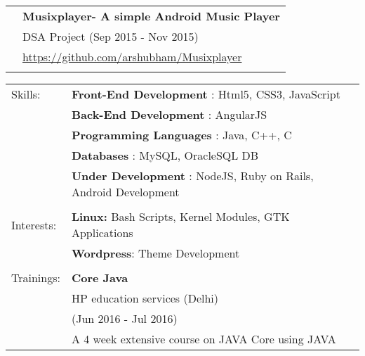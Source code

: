 \documentclass[letterpaper,11pt,oneside]{article}
\begin{document}
\begin{tabular}{@{} l l}
     & \textbf{Musixplayer- A simple Android Music Player} \\
     & DSA Project (Sep 2015 - Nov 2015) \\
     & \href{https://github.com/arshubham/Musixplayer}{https://github.com/arshubham/Musixplayer} \\
     & \\
     \end{tabular}
  \newpage   
  
\noindent \begin{tabular}{@{} l l}
 \LARGE{Skills:}   & \textbf{Front-End Development} : Html5, CSS3, JavaScript \\
  & \textbf{Back-End Development} : AngularJS \\
 & \textbf{Programming Languages} : Java, C++, C\\
 & \textbf{Databases} : MySQL, OracleSQL DB \\
 & \textbf{Under Development} : NodeJS, Ruby on Rails, Android Development \\
 &\\
 \LARGE{Interests:}  & \textbf{Linux: } Bash Scripts, Kernel Modules, GTK Applications \\
 & \textbf{Wordpress}: Theme Development \\
 &\\
 \LARGE{Trainings:} 
 & \textbf{Core Java} \\
 & HP education services (Delhi) \\
 & (Jun 2016 - Jul 2016) \\
 & A 4 week extensive course on JAVA Core using JAVA
 
 \end{tabular}
\end{document}
